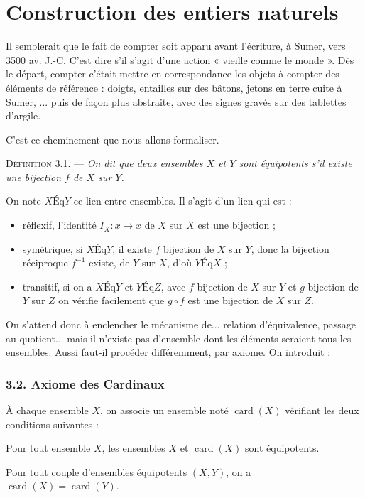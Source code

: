 \chapter{Construction des entiers naturels}

Il semblerait que le fait de compter soit apparu avant l'écriture, à Sumer, vers 3500 av. J.-C. C'est dire s'il s'agit d'une action « vieille comme le monde ». Dès le départ, compter c'était mettre en correspondance les objets à compter des éléments de référence : doigts, entailles sur des bâtons, jetons en terre cuite à Sumer, ... puis de façon plus abstraite, avec des signes gravés sur des tablettes d'argile.

C'est ce cheminement que nous allons formaliser.


\medskip\noindent\textsc{Définition 3.1.} --- \emph{On dit que deux ensembles $X$ et $Y$ sont équipotents s'il existe une bijection $f$ de $X$ sur $Y$.}

On note $X\mathrel{\mathrm{Éq}}Y$ ce lien entre ensembles. Il s'agit d'un lien qui est :
\begin{itemize}[leftmargin=2em]
\item réflexif, l'identité $I_X:x\mapsto x$ de $X$ sur $X$ est une bijection ;
\item symétrique, si $X\mathrel{\mathrm{Éq}}Y$, il existe $f$ bijection de $X$ sur $Y$, donc la bijection réciproque $f^{-1}$ existe, de $Y$ sur $X$, d'où $Y\mathrel{\mathrm{Éq}}X$ ;
\item transitif, si on a $X\mathrel{\mathrm{Éq}}Y$ et $Y\mathrel{\mathrm{Éq}}Z$, avec $f$ bijection de $X$ sur $Y$ et $g$ bijection de $Y$ sur $Z$ on vérifie facilement que $g\circ f$ est une bijection de $X$ sur $Z$.
\end{itemize}

On s'attend donc à enclencher le mécanisme de... relation d'équivalence, passage au quotient... mais il n'existe pas d'ensemble dont les éléments seraient tous les ensembles. Aussi faut-il procéder différemment, par axiome. On introduit :

\subsection*{3.2. Axiome des Cardinaux}

À chaque ensemble $X$, on associe un ensemble noté $\operatorname{card}(X)$ vérifiant les deux conditions suivantes :
\begin{description}[leftmargin=4.0em,labelwidth=3.2em,labelsep=.6em]
\item[(C$_1$)] Pour tout ensemble $X$, les ensembles $X$ et $\operatorname{card}(X)$ sont équipotents.
\item[(C$_2$)] Pour tout couple d'ensembles équipotents $(X,Y)$, on a $\operatorname{card}(X)=\operatorname{card}(Y)$.
\end{description}

